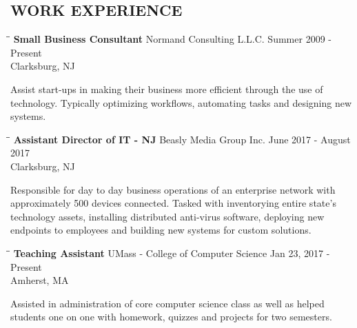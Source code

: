 \documentclass{res}
\begin{document}
\begin{resume}
\section{WORK EXPERIENCE}
	\vspace{-0.1in}
	\begin{tabbing}
		\hspace{2.3in}\= \hspace{2.6in}\= \kill %
		{\bf Small Business Consultant}  \>Normand Consulting L.L.C. \> Summer 2009 - Present \\
			\>Clarksburg, NJ
	\end{tabbing}\vspace{-20pt}            %
	Assist start-ups in making their business more efficient through the use of technology. Typically optimizing workflows, automating tasks and designing new systems.
	\vspace{-0.2in}
	\begin{tabbing}
		\hspace{2.3in}\= \hspace{2.6in}\= \kill %
		{\bf Assistant Director of IT - NJ}  \>Beasly Media Group Inc.\> June 2017 - August 2017\\
			\>Clarksburg, NJ
	\end{tabbing}\vspace{-20pt}            %
	Responsible for day to day business operations of an enterprise network with approximately 500 devices connected. Tasked with inventorying entire state's technology assets, installing distributed anti-virus software, deploying 		new endpoints to employees and building new systems for custom solutions.
	 \vspace{-0.2in}  
	 \begin{tabbing}
	 \hspace{2.3in}\= \hspace{2.6in}\= \kill %
		{\bf Teaching Assistant} \>UMass - College of Computer Science    \>Jan 23, 2017 - Present\\
														 \>Amherst, MA
	 \end{tabbing}\vspace{-20pt}      %
		Assisted in administration of core computer science class as well as helped students one on one with homework, quizzes and projects for two semesters.

\end{resume}
\end{document}

